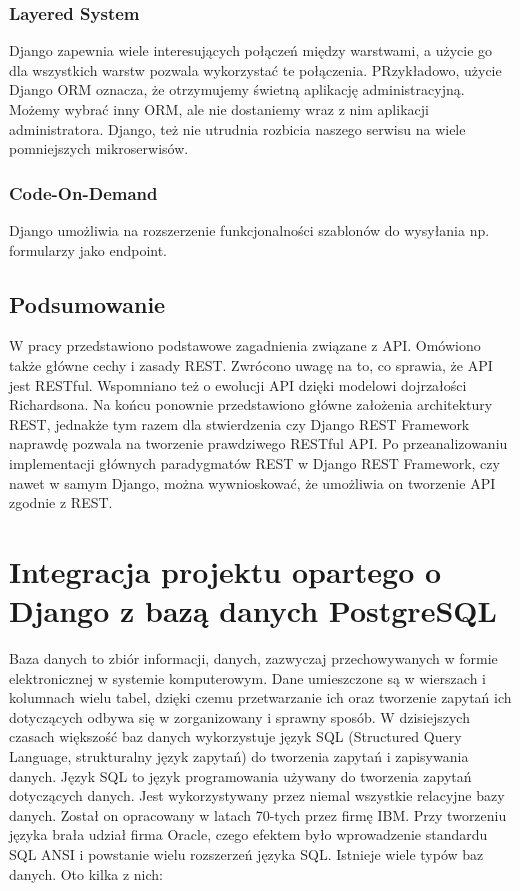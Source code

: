 \documentclass[oneside,polski,logo,indent]{amuthesis}
\begin{document}
\newpage
\begin{center}
\subsection{Layered System}
\end{center}
Django zapewnia wiele interesujących połączeń między warstwami, a użycie go dla wszystkich warstw pozwala wykorzystać te połączenia. PRzykładowo, użycie Django ORM oznacza, że otrzymujemy świetną aplikację administracyjną. Możemy wybrać inny ORM, ale nie dostaniemy wraz z nim aplikacji administratora. Django, też nie utrudnia rozbicia naszego serwisu na wiele pomniejszych mikroserwisów. 
\begin{center}
\subsection{Code-On-Demand}
\end{center}
Django umożliwia na rozszerzenie funkcjonalności szablonów do wysyłania np. formularzy jako endpoint.
\section{Podsumowanie}
W pracy przedstawiono podstawowe zagadnienia związane z API. Omówiono także główne cechy i zasady REST. Zwrócono uwagę na to, co sprawia, że API jest RESTful. Wspomniano też o ewolucji API dzięki modelowi dojrzałości Richardsona. Na końcu ponownie przedstawiono główne założenia architektury REST, jednakże tym razem dla stwierdzenia czy Django REST Framework naprawdę pozwala na tworzenie prawdziwego RESTful API. Po przeanalizowaniu implementacji głównych paradygmatów REST w Django REST Framework, czy nawet w samym Django, można wywnioskować, że umożliwia on tworzenie API zgodnie z REST.

\chapter{Integracja projektu opartego o Django z bazą danych PostgreSQL}
Baza danych to zbiór informacji, danych, zazwyczaj przechowywanych w formie elektronicznej w systemie komputerowym.  
Dane umieszczone są w wierszach i kolumnach wielu tabel, dzięki czemu przetwarzanie ich oraz tworzenie zapytań ich dotyczących odbywa się w zorganizowany i sprawny sposób. W dzisiejszych czasach większość baz danych wykorzystuje język SQL (Structured Query Language, strukturalny język zapytań) do tworzenia zapytań i zapisywania danych.  
Język SQL to język programowania używany do tworzenia zapytań dotyczących danych. Jest wykorzystywany przez niemal wszystkie relacyjne bazy danych. Został on opracowany w latach 70-tych przez firmę IBM. Przy tworzeniu języka brała udział firma Oracle, czego efektem było wprowadzenie standardu SQL ANSI i powstanie wielu rozszerzeń języka SQL.  
Istnieje wiele typów baz danych. Oto kilka z nich:  
\end{document}

